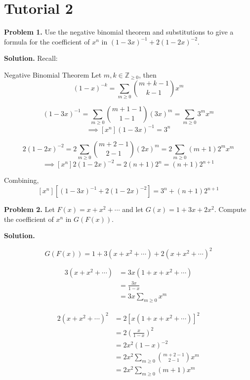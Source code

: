 \section{Tutorial 2}

\textbf{Problem 1.}
Use the negative binomial theorem and substitutions to give a formula for the
coefficient of $ x^n $ in $ (1-3x)^{-1} + 2(1-2x)^{-2} $.

\textbf{Solution.}
Recall:

\begin{Theorem}{Negative Binomial Theorem}{}
    Let $ m,k\in\mathbb{Z}_{\geqslant 0} $, then
    \[ (1-x)^{-k}=\sum\limits_{m\geqslant 0}\binom{m+k-1}{k-1}x^m \]
\end{Theorem}


\[ (1-3x)^{-1}=\sum\limits_{m\geqslant 0}\binom{m+1-1}{1-1} (3x)^m
    =\sum\limits_{m\geqslant 0} 3^m x^m \]
\[ \implies [x^n](1-3x)^{-1}
    =3^n \]

\[ 2(1-2x)^{-2}=2\sum\limits_{m\geqslant 0}\binom{m+2-1}{2-1}(2x)^m
    =2\sum\limits_{m\geqslant 0} (m+1)2^m x^m   \]
\[ \implies [x^n]2(1-2x)^{-2}
    =2(n+1)2^n=(n+1)2^{n+1} \]

Combining,
\[ [x^n]\left[ (1-3x)^{-1} + 2(1-2x)^{-2} \right]
    =3^n+(n+1) 2^{n+1} \]

\textbf{Problem 2.}
Let $ F(x)=x+x^2+\cdots $ and let $ G(x)=1+3x+2x^2 $. Compute the coefficient
of $ x^n $ in $ G(F(x)) $.

\textbf{Solution.}

\[ G(F(x))=1+3(x+x^2+\cdots)+2(x+x^2+\cdots)^2 \]

\begin{align*}
    3(x+x^2+\cdots)
     & = 3x(1+x+x^2+\cdots)                \\
     & =\frac{3x}{1-x}                     \\
     & = 3x \sum\limits_{m\geqslant 0} x^m
\end{align*}

\begin{align*}
    2(x+x^2+\cdots)^2
     & = 2\left[x(1+x+x^2+\cdots)\right]^2                   \\
     & =2\left( \frac{x}{1-x}  \right)^2                     \\
     & =2x^2(1-x)^{-2}                                       \\
     & =2x^2 \sum\limits_{m\geqslant 0}\binom{m+2-1}{2-1}x^m \\
     & =2x^2 \sum\limits_{m\geqslant 0}(m+1)x^m
\end{align*}

